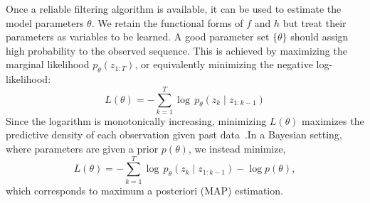 \documentclass{article}
\begin{document}
Once a reliable filtering algorithm is available, it can be used to estimate the model parameters $\theta$. We retain the functional forms of $f$ and $h$ but treat their parameters as variables to be learned. A good parameter set $\{\theta\}$ should assign high probability to the observed sequence. This is achieved by maximizing the marginal likelihood $p_\theta(z_{1:T})$, or equivalently minimizing the negative log-likelihood:
\begin{equation}
    L(\theta) = -\sum_{k=1}^{T} \log \, p_\theta(z_k \mid z_{1:k-1})
\end{equation}
Since the logarithm is monotonically increasing, minimizing $L(\theta)$ maximizes the predictive density of each observation given past data~\cite{Särkkä2013BayesianFilteringAndSmoothing}.In a Bayesian setting, where parameters are given a prior $p(\theta)$, we instead minimize,
\begin{equation}
    L(\theta) = -\sum_{k=1}^{T} \log \, p_\theta(z_k \mid z_{1:k-1}) - \log p(\theta),
\end{equation}
which corresponds to maximum a posteriori (MAP) estimation.












\end{document}
